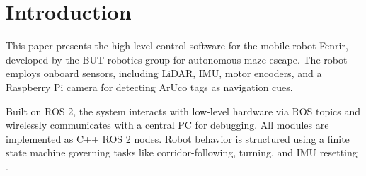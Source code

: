 
\section{Introduction}
This paper presents the high-level control software for the mobile robot Fenrir, developed by the BUT robotics group for autonomous maze escape. The robot employs onboard sensors, including LiDAR, IMU, motor encoders, and a Raspberry Pi camera for detecting ArUco tags as navigation cues.

Built on ROS 2, the system interacts with low-level hardware via ROS topics and wirelessly communicates with a central PC for debugging. All modules are implemented as C++ ROS 2 nodes. Robot behavior is structured using a finite state machine governing tasks like corridor-following, turning, and IMU resetting \cite{fenrir_project}.





